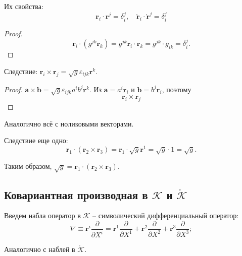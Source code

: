 Их свойства:
\[
  \mathbf{r}_i \cdot \mathbf{r}^j = \delta^j_i, \quad \mathring{\mathbf{r}}_i \cdot \mathring{\mathbf{r}}^j = \delta^j_i
\]
\begin{proof}
  \[
    \mathbf{r}_i \cdot (g^{jk} \mathbf{r}_k)
    = g^{jk} \mathbf{r}_i \cdot \mathbf{r}_k
    = g^{jk} \cdot g_{ik} = \delta_i^j.
  \]
\end{proof}

Следствие: $\mathbf{r}_i \times \mathbf{r}_j = \sqrt{g} \varepsilon_{ijk} \mathbf{r}^k$.

\begin{proof}
  $\mathbf{a} \times \mathbf{b} = \sqrt{g} \varepsilon_{ijk} a^i b^j \mathbf{r}^k$.
  Из $\mathbf{a} = a^i \mathbf{r}_i$ и $\mathbf{b} = b^j \mathbf{r}_i$, поэтому 
  \[
    \mathbf{r}_i \times \mathbf{r}_j
  \]
\end{proof}

Аналогично всё с ноликовыми векторами.

Следствие еще одно:
\[
  \mathbf{r}_1 \cdot (\mathbf{r}_2 \times \mathbf{r}_3)
  = \mathbf{r}_1 \cdot \sqrt{g} \mathbf{r}^1
  = \sqrt{g} \cdot 1 = \sqrt{g}.
\]

Таким образом, $\sqrt{g} = \mathbf{r}_1 \cdot (\mathbf{r}_2 \times \mathbf{r}_3)$.


\subsection{Ковариантная производная в $\mathcal{K}$ и $\mathring{\mathcal{K}}$}

Введем набла оператор в $\mathcal{K}$ -- символический дифференциальный оператор:
\[
  \nabla \equiv \mathbf{r}^i \frac{\partial }{\partial X^i} 
  = \mathbf{r}^1 \frac{\partial }{\partial X^1} + \mathbf{r}^2 \frac{\partial }{\partial X^2} 
  + \mathbf{r}^3 \frac{\partial }{\partial X^3};
\]

Аналогично с наблей в $\mathring{\mathcal{K}}$.

